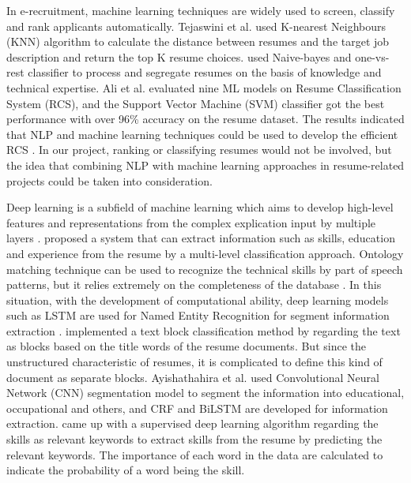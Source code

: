 In e-recruitment, machine learning techniques are widely used to screen, classify and rank applicants automatically. Tejaswini et al. \cite{tejaswini2021design} used K-nearest Neighbours (KNN) algorithm to calculate the distance between resumes and the target job description and return the top K resume choices. \cite{vamsi2021resume} used Naive-bayes and one-vs-rest classifier to process and segregate resumes on the basis of knowledge and technical expertise. Ali et al. \cite{ali2022resume} evaluated nine ML models on Resume Classification System (RCS), and the Support Vector Machine (SVM) classifier got the best performance with over 96\% accuracy on the resume dataset. The results indicated that NLP and machine learning techniques could be used to develop the efficient RCS \cite{ali2022resume}. In our project, ranking or classifying resumes would not be involved, but the idea that combining NLP with machine learning approaches in resume-related projects could be taken into consideration.

Deep learning is a subfield of machine learning which aims to develop high-level features and representations from the complex explication input by multiple layers \cite{deng2014foundations}. \cite{gunaseelan2020automatic} proposed a system that can extract information such as skills, education and experience from the resume by a multi-level classification approach. Ontology matching technique can be used to recognize the technical skills by part of speech patterns, but it relies extremely on the completeness of the database \cite{chifu2017system}. In this situation, with the development of computational ability, deep learning models such as LSTM are used for Named Entity Recognition for segment information extraction \cite{gunaseelan2020automatic}. \cite{chen2018two} implemented a text block classification method by regarding the text as blocks based on the title words of the resume documents. But since the unstructured characteristic of resumes, it is complicated to define this kind of document as separate blocks. Ayishathahira et al. \cite{ayishathahira2018combination} used Convolutional Neural Network (CNN) segmentation model to segment the information into educational, occupational and others, and CRF and BiLSTM are developed for information extraction. \cite{kumar2019supervised} came up with a supervised deep learning algorithm regarding the skills as relevant keywords to extract skills from the resume by predicting the relevant keywords. The importance of each word in the data are calculated to indicate the probability of a word being the skill.

